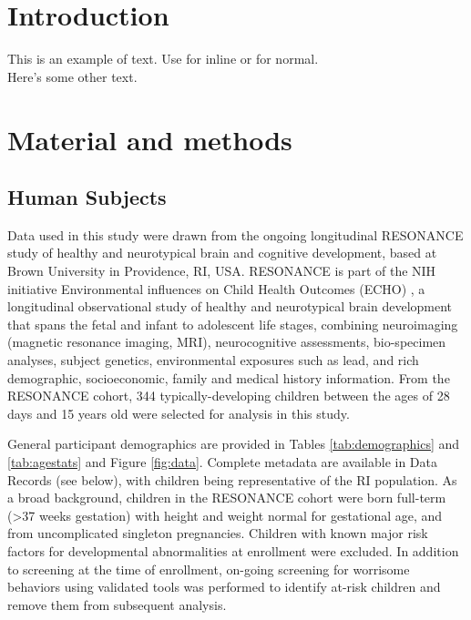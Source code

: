 \documentclass[a4paper]{article}
\begin{document}
\beginingpreprint


\section*{Introduction}

This is an example of text. Use \textcite{levins1971regional} for inline or \parencite{crooks2004spatial} for normal. \\ %

Here's some other text.

\section*{Material and methods}

\subsection*{Human Subjects}

Data used in this study were drawn from the ongoing longitudinal RESONANCE study
of healthy and neurotypical brain and cognitive development,
based at Brown University in Providence, RI, USA.
RESONANCE is part of the NIH initiative Environmental influences on Child Health Outcomes (ECHO) \cite{Forrest2018-ud,Gillman2018-om},
a longitudinal observational study of healthy and neurotypical brain development
that spans the fetal and infant to adolescent life stages,
combining neuroimaging (magnetic resonance imaging, MRI), neurocognitive assessments, bio-specimen analyses, subject genetics,
environmental exposures such as lead, and rich demographic, socioeconomic, family and medical history information.
From the RESONANCE cohort, 344 typically-developing children
between the ages of 28 days and 15 years old were selected for analysis in this study. 

General participant demographics are provided in Tables \ref{tab:demographics} and \ref{tab:agestats} and Figure \ref{fig:data}.
Complete metadata are available in Data Records (see below), with children being representative of the RI population.
As a broad background, children in the RESONANCE cohort were born full-term (>37 weeks gestation)
with height and weight normal for gestational age, and from uncomplicated singleton pregnancies.
Children with known major risk factors for developmental abnormalities at enrollment were excluded.
In addition to screening at the time of enrollment,
on-going screening for worrisome behaviors using validated tools was performed
to identify at-risk children and remove them from subsequent analysis.
\end{document}
